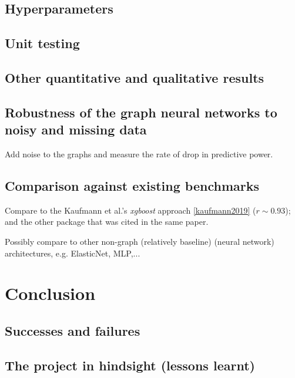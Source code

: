 \documentclass[12pt,a4paper,twoside, openright, hidelinks]{report}
\begin{document}
\section{Hyperparameters}

\section{Unit testing}

\section{Other quantitative and qualitative results}

\section{Robustness of the graph neural networks to noisy and missing data}

Add noise to the graphs and measure the rate of drop in predictive power.

\section{Comparison against existing benchmarks}

Compare to the Kaufmann et al.'s \textit{xgboost} approach \ref{kaufmann2019} ($r \sim 0.93$); and the other package that was cited in the same paper.

Possibly compare to other non-graph (relatively baseline) (neural network) architectures, e.g. ElasticNet, MLP,...

\chapter{Conclusion}


\section{Successes and failures}

\section{The project in hindsight (lessons learnt)}
\end{document}
